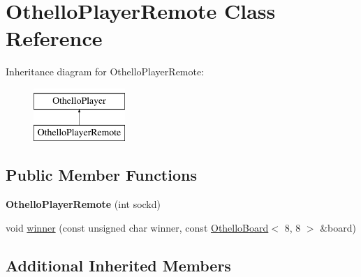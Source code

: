 \hypertarget{classOthelloPlayerRemote}{\section{Othello\-Player\-Remote Class Reference}
\label{classOthelloPlayerRemote}
}
Inheritance diagram for Othello\-Player\-Remote\-:\begin{figure}[H]
\begin{center}
\leavevmode
\includegraphics[height=2.000000cm]{classOthelloPlayerRemote}
\end{center}
\end{figure}
\subsection*{Public Member Functions}
\begin{DoxyCompactItemize}
\item 
\hypertarget{classOthelloPlayerRemote_ae06abf8567284ffdefe13da89fe99138}{{\bfseries Othello\-Player\-Remote} (int sockd)}\label{classOthelloPlayerRemote_ae06abf8567284ffdefe13da89fe99138}

\item 
void \hyperlink{classOthelloPlayerRemote_a6d7f6c0544aa6a6eb219e69d6c6d2e41}{winner} (const unsigned char winner, const \hyperlink{classOthelloBoard}{Othello\-Board}$<$ 8, 8 $>$ \&board)
\end{DoxyCompactItemize}
\subsection*{Additional Inherited Members}


